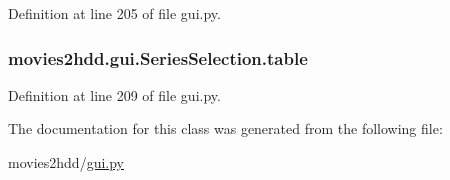 Definition at line 205 of file gui.\-py.

\hypertarget{classmovies2hdd_1_1gui_1_1_series_selection_ac297f3ae5b7cbba9f01a3ebf7fa2fbb5}{
\subsubsection[{table}]{\setlength{\rightskip}{0pt plus 5cm}movies2hdd.\-gui.\-Series\-Selection.\-table}}\label{classmovies2hdd_1_1gui_1_1_series_selection_ac297f3ae5b7cbba9f01a3ebf7fa2fbb5}


Definition at line 209 of file gui.\-py.



The documentation for this class was generated from the following file\-:\begin{DoxyCompactItemize}
\item 
movies2hdd/\hyperlink{gui_8py}{gui.\-py}\end{DoxyCompactItemize}
